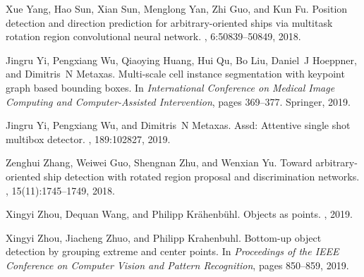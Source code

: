 \documentclass[10pt,twocolumn,letterpaper]{article}
\begin{document}
\begin{thebibliography}{10}
Xue Yang, Hao Sun, Xian Sun, Menglong Yan, Zhi Guo, and Kun Fu.
\newblock Position detection and direction prediction for arbitrary-oriented
  ships via multitask rotation region convolutional neural network.
, 6:50839--50849, 2018.

Jingru Yi, Pengxiang Wu, Qiaoying Huang, Hui Qu, Bo Liu, Daniel~J Hoeppner, and
  Dimitris~N Metaxas.
\newblock Multi-scale cell instance segmentation with keypoint graph based
  bounding boxes.
\newblock In {\em International Conference on Medical Image Computing and
  Computer-Assisted Intervention}, pages 369--377. Springer, 2019.

Jingru Yi, Pengxiang Wu, and Dimitris~N Metaxas.
\newblock Assd: Attentive single shot multibox detector.
, 189:102827, 2019.

Zenghui Zhang, Weiwei Guo, Shengnan Zhu, and Wenxian Yu.
\newblock Toward arbitrary-oriented ship detection with rotated region proposal
  and discrimination networks.
, 15(11):1745--1749,
  2018.

Xingyi Zhou, Dequan Wang, and Philipp Kr{\"a}henb{\"u}hl.
\newblock Objects as points.
, 2019.

Xingyi Zhou, Jiacheng Zhuo, and Philipp Krahenbuhl.
\newblock Bottom-up object detection by grouping extreme and center points.
\newblock In {\em Proceedings of the IEEE Conference on Computer Vision and
  Pattern Recognition}, pages 850--859, 2019.

\end{thebibliography}
 
\end{document}
